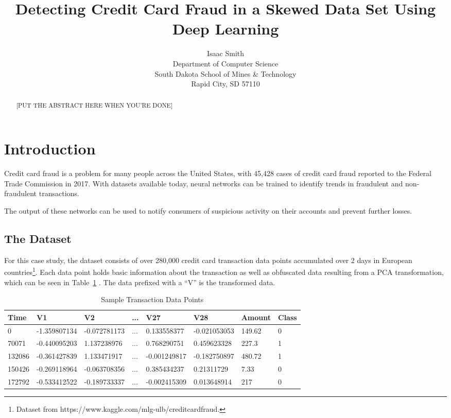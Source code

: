 \documentclass{article}
\title{Detecting Credit Card Fraud in a Skewed Data Set Using Deep Learning}
\author{
  Isaac Smith \\
  Department of Computer Science\\
  South Dakota School of Mines & Technology\\
  Rapid City, SD 57110 \\
}
\begin{document}

\maketitle

\begin{abstract}
 [PUT THE ABSTRACT HERE WHEN YOU'RE DONE]
\end{abstract}

\section{Introduction}

 Credit card fraud is a problem for many people across the United States,
 with 45,428 cases of credit card fraud reported to the Federal Trade Commission in 2017.
 With datasets available today, neural networks can be trained to identify trends
 in fraudulent and non-fraudulent transactions.

 The output of these networks can be used to notify consumers of
 suspicious activity on their accounts and prevent further losses.


\subsection{The Dataset}


For this case study, the dataset consists of over 280,000 credit card transaction 
data points accumulated over 2 days in European countries\footnote{Dataset from
 https://www.kaggle.com/mlg-ulb/creditcardfraud.}. Each data point 
holds basic information about the transaction as well as obfuscated data resulting 
from a PCA transformation, which can be seen in Table~\ref{sample-points} . The data 
prefixed with a “V” is the transformed data.

\begin{table}[htb]
  \caption{Sample Transaction Data Points}
  \label{sample-points}
  \centering
  \begin{tabular}{llllllll}	
    \toprule
    Time & V1 & V2  & ... & V27 & V28 & Amount & Class \\
    \midrule
    0 & -1.359807134  & -0.072781173 &    ...    & 0.133558377 & -0.021053053 & 149.62 & 0    \\
    70071 & -0.440095203  & 1.137238976 &    ...    & 0.768290751 & 0.459623328 & 227.3 & 1    \\
    132086 & -0.361427839 & 1.133471917 &    ...    & -0.001249817 & -0.182750897 & 480.72 & 1 \\
    150426 & -0.269118964  & -0.063708356 &    ...    & 0.385434237 & 0.21311729 & 7.33 & 0    \\
    172792 & -0.533412522  & -0.189733337 &    ...    & -0.002415309 & 0.013648914 & 217 & 0    \\
    \bottomrule
  \end{tabular}
\end{table}
\end{document}
